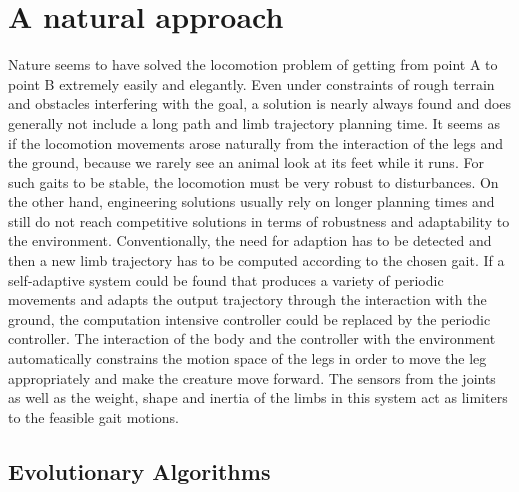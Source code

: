 \documentclass[main]{subfiles}
\begin{document}
\section{A natural approach}

Nature seems to have solved the locomotion problem of getting from point A to point B extremely easily and elegantly. %
%
Even under constraints of rough terrain and obstacles interfering with the goal, a solution is nearly always found and does generally not include a long path and limb trajectory planning time. %
%
It seems as if the locomotion movements arose naturally from the interaction of the legs and the ground, because we rarely see an animal look at its feet while it runs. %
%
For such gaits to be stable, the locomotion must be very robust to disturbances. %
%
On the other hand, engineering solutions usually rely on longer planning times and still do not reach competitive solutions in terms of robustness and adaptability to the environment. %
%
Conventionally, the need for adaption has to be detected and then a new limb trajectory has to be computed according to the chosen gait. %
%
If a self-adaptive system could be found that produces a variety of periodic movements and adapts the output trajectory through the interaction with the ground, the computation intensive controller could be replaced by the periodic controller. %
%
The interaction of the body and the controller with the environment automatically constrains the motion space of the legs in order to move the leg appropriately and make the creature move forward. %
%
The sensors from the joints as well as the weight, shape and inertia of the limbs in this system act as limiters to the feasible gait motions.

\subsection{Evolutionary Algorithms}
\end{document}
